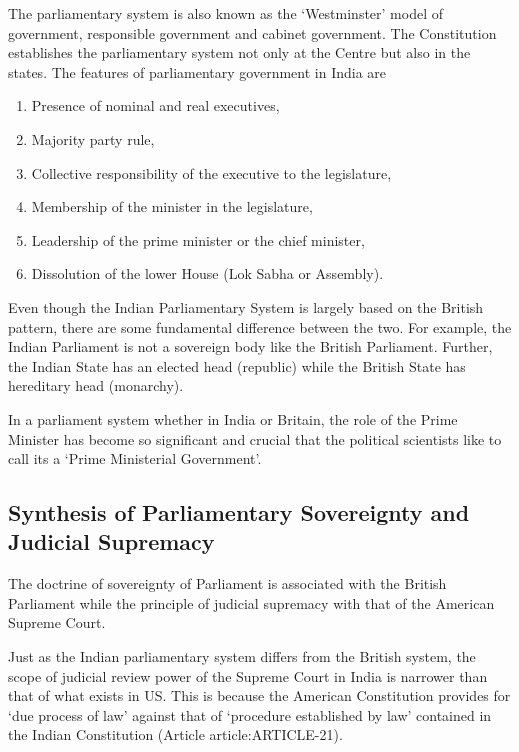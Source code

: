 \begin{multicols}{2}
The parliamentary system is also known as the `Westminster' model of government, responsible government and cabinet government. The Constitution establishes the parliamentary system not only at the Centre but also in the states. The features of parliamentary government in India are

\renewcommand{\labelenumi}{\textbf{(\alph{enumi})}}
\begin{enumerate}
  \item Presence of nominal and real executives,
  \item Majority party rule,
  \item Collective responsibility of the executive to the legislature,
  \item Membership of the minister in the legislature,
  \item Leadership of the prime minister or the chief minister,
  \item Dissolution of the lower House (Lok Sabha or Assembly).
\end{enumerate}

Even though the Indian Parliamentary System is largely based on the British pattern, there are some fundamental difference between the two. For example, the Indian Parliament is not a sovereign body like the British Parliament. Further, the Indian State has an elected head (republic) while the British State has hereditary head (monarchy).

In a parliament system whether in India or Britain, the role of the Prime Minister has become so significant and crucial that the political scientists like to call its a `Prime Ministerial Government'.

\subsection{Synthesis of Parliamentary Sovereignty and Judicial Supremacy}

The doctrine of sovereignty of Parliament is associated with the British Parliament while the principle of judicial supremacy with that of the American Supreme Court.

Just as the Indian parliamentary system differs from the British system, the scope of judicial review power of the Supreme Court in India is narrower than that of what exists in US. This is because the American Constitution provides for `due process of law' against that of `procedure established by law' contained in the Indian Constitution (Article \gls{article:ARTICLE-21}).


\end{multicols}
